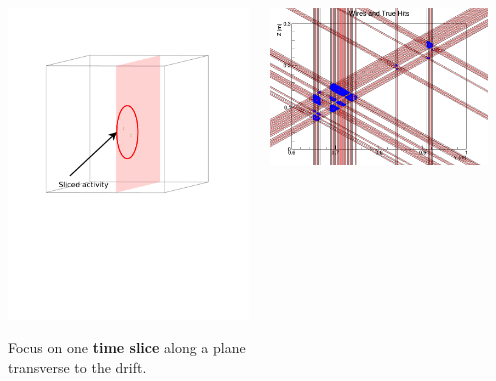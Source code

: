 \begin{frame}[fragile]
\begin{columns}
\begin{column}{0.35\textwidth}
\begin{center}
        \includegraphics[width=\textwidth,trim=0cm 10cm 0cm 0cm,clip]{slice-3D.pdf}

        \scriptsize Focus on one \textbf{time slice} along a plane transverse to the drift.
      \end{center}
    \end{column}
    \begin{column}{0.65\textwidth}

      \includegraphics[width=0.9\textwidth]{wires-and-true-hits.png}


\end{column}
\end{columns}
\end{frame}

